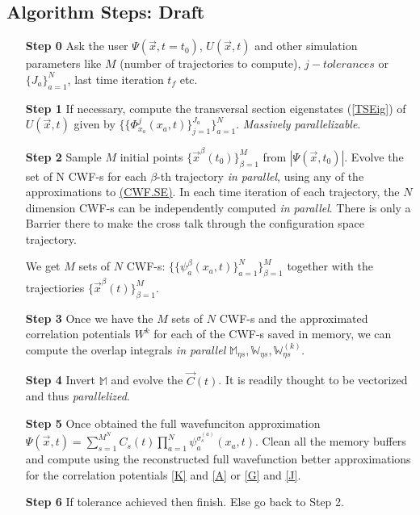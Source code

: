 \documentclass[11pt, a4paper]{article} %
\begin{document}
\subsection{Algorithm Steps: Draft}
\begin{enumerate}
\item[{\bf Step 0}] Ask the user $\Psi(\vec{x},t=t_0)$, $U(\vec{x},t)$ and other simulation parameters like $M$ (number of trajectories to compute), $j-tolerances$ or $\{J_a\}_{a=1}^N$, last time iteration $t_f$ etc.

\item[{\bf Step 1}] If necessary, compute the transversal section eigenstates (\ref{TSEig}) of $U(\vec{x},t)$ given by $\{\{ \Phi_{x_a}^j(x_a,t)\}_{j=1}^{J_a}\}_{a=1}^N$. \textit{Massively parallelizable}.

\item[{\bf Step 2}] Sample $M$ initial points $\{\vec{x}^\beta(t_0)\}_{\beta=1}^M$ from $|\Psi(\vec{x},t_0)|$. Evolve the set of N CWF-s for each $\beta$-th trajectory \textit{in parallel}, using any of the approximations to \hyperlink{CWF.SE}{(CWF.SE)}. In each time iteration of each trajectory, the $N$ dimension CWF-s can be independently computed {\em in parallel}. There is only a Barrier there to make the cross talk through the configuration space trajectory.

We get $M$ sets of $N$ CWF-s: $\{\{\psi^\beta_a(x_a,t)\}_{a=1}^N\}_{\beta=1}^M$ together with the trajectiories $\{ \vec{x}^\beta(t)\}_{\beta=1}^M$.


\item[{\bf Step 3}] Once we have the $M$ sets of $N$ CWF-s and the approximated correlation potentials $W^{k}$ for each of the CWF-s saved in memory, we can compute the overlap integrals {\em in parallel} $\mathbb{M}_{\eta s}, \mathbb{W}_{\eta s}, \mathbb{W}^{(k)}_{\eta s}$.


\item[{\bf Step 4}] Invert $\mathbb{M}$ and evolve the $\vec{C}(t)$. It is readily thought to be vectorized and thus {\em parallelized}.


\item[{\bf Step 5}] Once obtained the full wavefunciton approximation $\Psi(\vec{x},t)= \sum_{s=1}^{M^N} C_s(t) \prod_{a=1}^N \psi_a^{\sigma^{(a)}_s}(x_a,t)$. Clean all the memory buffers and compute using the reconstructed full wavefunction better approximations for the correlation potentials \ref{K} and \ref{A} or \ref{G} and \ref{J}.

\item[{\bf Step 6}] If tolerance achieved then finish. Else go back to Step 2.
\end{enumerate}
\end{document}
